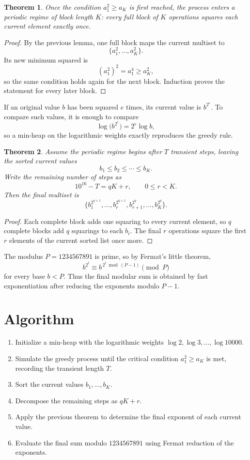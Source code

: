 \documentclass[11pt]{article}
\newtheorem{theorem}{Theorem}
\begin{document}
\begin{theorem}
Once the condition $a_1^2 \ge a_K$ is first reached, the process enters a periodic regime of block length $K$: every full block of $K$ operations squares each current element exactly once.
\end{theorem}

\begin{proof}
By the previous lemma, one full block maps the current multiset to
\[
\{a_1^2,\dots,a_K^2\}.
\]
Its new minimum squared is
\[
(a_1^2)^2=a_1^4 \ge a_K^2,
\]
so the same condition holds again for the next block. Induction proves the statement for every later block.
\end{proof}

If an original value $b$ has been squared $e$ times, its current value is $b^{2^e}$. To compare such values, it is enough to compare
\[
\log\!\bigl(b^{2^e}\bigr)=2^e \log b,
\]
so a min-heap on the logarithmic weights exactly reproduces the greedy rule.

\begin{theorem}
Assume the periodic regime begins after $T$ transient steps, leaving the sorted current values
\[
b_1 \le b_2 \le \cdots \le b_K.
\]
Write the remaining number of steps as
\[
10^{16}-T = qK+r,\qquad 0 \le r < K.
\]
Then the final multiset is
\[
\{b_1^{2^{q+1}},\dots,b_r^{2^{q+1}},b_{r+1}^{2^q},\dots,b_K^{2^q}\}.
\]
\end{theorem}

\begin{proof}
Each complete block adds one squaring to every current element, so $q$ complete blocks add $q$ squarings to each $b_i$. The final $r$ operations square the first $r$ elements of the current sorted list once more.
\end{proof}

The modulus $P=1234567891$ is prime, so by Fermat's little theorem,
\[
b^{2^t} \equiv b^{\,2^t \bmod (P-1)} \pmod P
\]
for every base $b<P$. Thus the final modular sum is obtained by fast exponentiation after reducing the exponents modulo $P-1$.

\section{Algorithm}

\begin{enumerate}
\item Initialize a min-heap with the logarithmic weights $\log 2,\log 3,\dots,\log 10000$.
\item Simulate the greedy process until the critical condition $a_1^2 \ge a_K$ is met, recording the transient length $T$.
\item Sort the current values $b_1,\dots,b_K$.
\item Decompose the remaining steps as $qK+r$.
\item Apply the previous theorem to determine the final exponent of each current value.
\item Evaluate the final sum modulo $1234567891$ using Fermat reduction of the exponents.
\end{enumerate}
\end{document}

